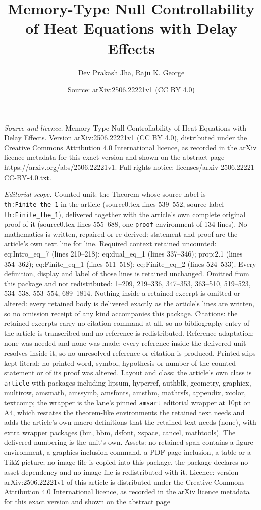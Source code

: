 \documentclass[10pt,a4paper]{amsart}
\title[Memory-Type Null Controllability of Heat Equations with Dela]{Memory-Type Null Controllability of Heat Equations with Delay Effects}
\author{Dev Prakash Jha, Raju K. George}
\date{Source: arXiv:2506.22221v1 (CC BY 4.0)}
\begin{document}
\maketitle

\noindent\emph{Source and licence.} Memory-Type Null Controllability of Heat Equations with Delay Effects. Version arXiv:2506.22221v1 (CC BY 4.0), distributed under the Creative Commons Attribution 4.0 International licence, as recorded in the arXiv licence metadata for this exact version and shown on the abstract page https://arxiv.org/abs/2506.22221v1. Full rights notice: licenses/arxiv-2506.22221-CC-BY-4.0.txt.\par\smallskip

\noindent\textit{Editorial scope.} Counted unit: the Theorem whose source label is \texttt{th:Finite\_the\_1} in the article (source0.tex lines 539--552, source label \texttt{th:Finite\_the\_1}), delivered together with the article's own complete original proof of it (source0.tex lines 555--688, one \texttt{proof} environment of 134 lines). No mathematics is written, repaired or re-derived: statement and proof are the article's own text line for line. Required context retained uncounted: eq:Intro\_eq\_7 (lines 210--218); eq:dual\_eq\_1 (lines 337--346); prop:2.1 (lines 354--362); eq:Finite\_eq\_1 (lines 511--518); eq:Finite\_eq\_2 (lines 524--533). Every definition, display and label of those lines is retained unchanged. Omitted from this package and not redistributed: 1--209, 219--336, 347--353, 363--510, 519--523, 534--538, 553--554, 689--1814. Nothing inside a retained excerpt is omitted or altered: every retained body is delivered exactly as the article's lines are written, so no omission receipt of any kind accompanies this package. Citations: the retained excerpts carry no citation command at all, so no bibliography entry of the article is transcribed and no reference is redistributed. Reference adaptation: none was needed and none was made; every reference inside the delivered unit resolves inside it, so no unresolved reference or citation is produced. Printed slips kept literal: no printed word, symbol, hypothesis or number of the counted statement or of its proof was altered. Layout and class: the article's own class is \texttt{article} with packages including lipsum, hyperref, authblk, geometry, graphicx, multirow, amsmath, amssymb, amsfonts, amsthm, mathrsfs, appendix, xcolor, textcomp; the wrapper is the lane's pinned \texttt{amsart} editorial wrapper at 10pt on A4, which restates the theorem-like environments the retained text needs and adds the article's own macro definitions that the retained text needs (none), with extra wrapper packages (bm, bbm, dsfont, xspace, cancel, mathtools). The delivered numbering is the unit's own. Assets: no retained span contains a figure environment, a graphics-inclusion command, a PDF-page inclusion, a table or a TikZ picture; no image file is copied into this package, the package declares no asset dependency and no image file is redistributed with it. Licence: version arXiv:2506.22221v1 of this article is distributed under the Creative Commons Attribution 4.0 International licence, as recorded in the arXiv licence metadata for this exact version and shown on the abstract page 
\end{document}

